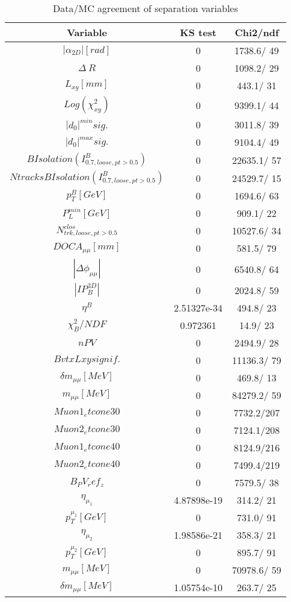 \documentclass{article}
\begin{document}
\begin{table}[htbp]
\caption{\label{tab:sepVars}Data/MC agreement of separation variables}
\begin{center}
\begin{tabular}{c|c|c}
Variable & KS test & Chi2/ndf \\
\hline
$|\alpha_{2D}| [rad]$ & 0 & 1738.6/ 49\\
\hline
$\Delta~R$ & 0 & 1098.2/ 29\\
\hline
$L_{xy} [mm]$ & 0 & 443.1/ 31\\
\hline
$Log(\chi^{2}_{xy})$ & 0 & 9399.1/ 44\\
\hline
$|d_{0}|^{min} sig.$ & 0 & 3011.8/ 39\\
\hline
$|d_{0}|^{max} sig.$ & 0 & 9104.4/ 49\\
\hline
$B Isolation (I^{B}_{0.7, loose, pt>0.5})$ & 0 & 22635.1/ 57\\
\hline
$Ntracks B Isolation (I^{B}_{0.7, loose, pt>0.5})$ & 0 & 24529.7/ 15\\
\hline
$p_{T}^{B} [GeV]$ & 0 & 1694.6/ 63\\
\hline
$P^{min}_{L} [GeV]$ & 0 & 909.1/ 22\\
\hline
$N^{clos}_{trk, loose, pt>0.5}$ & 0 & 10527.6/ 34\\
\hline
$DOCA_{\mu\mu} [mm]$ & 0 & 581.5/ 79\\
\hline
$|\Delta\phi_{\mu\mu}|$ & 0 & 6540.8/ 64\\
\hline
$|IP_{B}^{3D}|$ & 0 & 2024.8/ 59\\
\hline
$\eta^{B}$ & 2.51327e-34 & 494.8/ 23\\
\hline
$\chi^{2}_{B}/NDF$ & 0.972361 &  14.9/ 23\\
\hline
$nPV$ & 0 & 2494.9/ 28\\
\hline
$BvtxLxy signif.$ & 0 & 11136.3/ 79\\
\hline
$\delta m_{\mu\mu} [MeV]$ & 0 & 469.8/ 13\\
\hline
$m_{\mu\mu} [MeV]$ & 0 & 84279.2/ 59\\
\hline
$Muon1_etcone30$ & 0 & 7732.2/207\\
\hline
$Muon2_etcone30$ & 0 & 7124.1/208\\
\hline
$Muon1_etcone40$ & 0 & 8124.9/216\\
\hline
$Muon2_etcone40$ & 0 & 7499.4/219\\
\hline
$B_PV_ref_z$ & 0 & 7579.5/ 38\\
\hline
$\eta_{\mu_{1}}$ & 4.87898e-19 & 314.2/ 21\\
\hline
$p_{T}^{\mu_{1}} [GeV]$ & 0 & 731.0/ 91\\
\hline
$\eta_{\mu_{2}}$ & 1.98586e-21 & 358.3/ 21\\
\hline
$p_{T}^{\mu_{2}} [GeV]$ & 0 & 895.7/ 91\\
\hline
$m_{\mu\mu} [MeV]$ & 0 & 70978.6/ 59\\
\hline
$\delta m_{\mu\mu} [MeV]$ & 1.05754e-10 & 263.7/ 25\\
\hline
\end{tabular}
\end{center}
\end{table}
\end{document}
